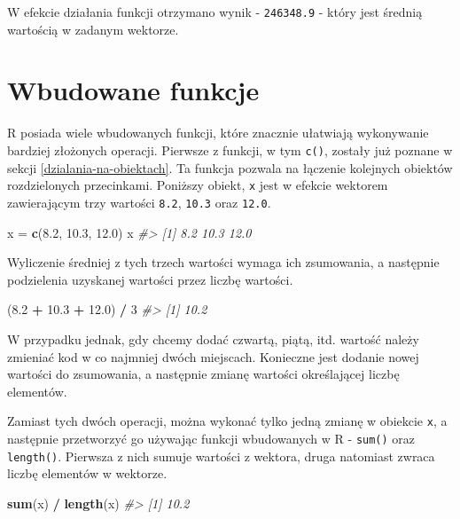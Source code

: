 \documentclass[paper=6in:9in,pagesize=pdftex,headinclude=on,footinclude=on,10pt]{scrbook}
\newenvironment{Shaded}{\begin{snugshade}}{\end{snugshade}}
\newcommand{\CommentTok}[1]{\textcolor[rgb]{0.56,0.35,0.01}{\textit{#1}}}
\newcommand{\DecValTok}[1]{\textcolor[rgb]{0.00,0.00,0.81}{#1}}
\newcommand{\FloatTok}[1]{\textcolor[rgb]{0.00,0.00,0.81}{#1}}
\newcommand{\KeywordTok}[1]{\textcolor[rgb]{0.13,0.29,0.53}{\textbf{#1}}}
\newcommand{\NormalTok}[1]{#1}
\newcommand{\OperatorTok}[1]{\textcolor[rgb]{0.81,0.36,0.00}{\textbf{#1}}}
\newcommand{\StringTok}[1]{\textcolor[rgb]{0.31,0.60,0.02}{#1}}
\begin{document}
W efekcie działania funkcji otrzymano wynik - \texttt{246348.9} - który jest średnią wartością w zadanym wektorze.

\hypertarget{wbudowane-funkcje}{%
\section{Wbudowane funkcje}\label{wbudowane-funkcje}}

R posiada wiele wbudowanych funkcji, które znacznie ułatwiają wykonywanie bardziej złożonych operacji.
Pierwsze z funkcji, w tym \texttt{c()}, zostały już poznane w sekcji \ref{dzialania-na-obiektach}.
Ta funkcja pozwala na łączenie kolejnych obiektów rozdzielonych przecinkami.
Poniższy obiekt, \texttt{x} jest w efekcie wektorem zawierającym trzy wartości \texttt{8.2}, \texttt{10.3} oraz \texttt{12.0}.

\begin{Shaded}
\begin{Highlighting}[]
\NormalTok{x =}\StringTok{ }\KeywordTok{c}\NormalTok{(}\FloatTok{8.2}\NormalTok{, }\FloatTok{10.3}\NormalTok{, }\FloatTok{12.0}\NormalTok{)}
\NormalTok{x}
\CommentTok{#> [1]  8.2 10.3 12.0}
\end{Highlighting}
\end{Shaded}

Wyliczenie średniej z tych trzech wartości wymaga ich zsumowania, a następnie podzielenia uzyskanej wartości przez liczbę wartości.

\begin{Shaded}
\begin{Highlighting}[]
\NormalTok{(}\FloatTok{8.2} \OperatorTok{+}\StringTok{ }\FloatTok{10.3} \OperatorTok{+}\StringTok{ }\FloatTok{12.0}\NormalTok{) }\OperatorTok{/}\StringTok{ }\DecValTok{3}
\CommentTok{#> [1] 10.2}
\end{Highlighting}
\end{Shaded}

W przypadku jednak, gdy chcemy dodać czwartą, piątą, itd. wartość należy zmieniać kod w co najmniej dwóch miejscach.
Konieczne jest dodanie nowej wartości do zsumowania, a następnie zmianę wartości określającej liczbę elementów.

Zamiast tych dwóch operacji, można wykonać tylko jedną zmianę w obiekcie \texttt{x}, a następnie przetworzyć go używając funkcji wbudowanych w R - \texttt{sum()} oraz \texttt{length()}.
Pierwsza z nich sumuje wartości z wektora, druga natomiast zwraca liczbę elementów w wektorze.

\begin{Shaded}
\begin{Highlighting}[]
\KeywordTok{sum}\NormalTok{(x) }\OperatorTok{/}\StringTok{ }\KeywordTok{length}\NormalTok{(x)}
\CommentTok{#> [1] 10.2}
\end{Highlighting}
\end{Shaded}
\end{document}
